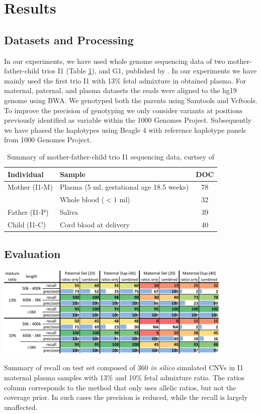 \section{Results}

\subsection{Datasets and Processing}
\label{data}
In our experiments, we have used whole genome sequencing data of two mother-father-child trios I1 (Table \ref{tab:I1}), and G1, published by \cite{kitzman2012}. In our experiments we have mainly used the first trio I1 with 13\% fetal admixture in obtained plasma. For maternal, paternal, and plasma datasets the reads were aligned to the hg19 genome using BWA. We genotyped both the parents using Samtools and Vcftools. To improve the precision of genotyping we only consider variants at positions previously identified as variable within the 1000 Genomes Project.  Subsequently we have phased the haplotypes using Beagle 4 \cite{browning2013} with reference haplotype panels from 1000 Genomes Project. 
\begin{table}[t]
\centering
\begin{tabular}{l|l|c}
Individual & Sample & DOC \\ \hline
Mother (I1-M) & Plasma (5 ml, gestational age 18.5 weeks) & 78 \\
	& Whole blood ($<1$ ml) & 32 \\
Father (I1-P) & Saliva & 39 \\
Child (I1-C) & Cord blood at delivery & 40
\end{tabular}
\vspace{3pt}
\caption{Summary of mother-father-child trio I1 sequencing data, curtsey of \cite{kitzman2012}  }
\label{tab:I1} 
\end{table}

\subsection{Evaluation}
\begin{table}[t]
\centering
\includegraphics[width=0.85\textwidth]{figures/ismb_res_color}
\caption{Summary of recall on test set composed of 360 \emph{in silico} simulated CNVs in I1 maternal plasma samples with 13\% and 10\% fetal admixture ratio. The ratios column corresponds to the method that only uses allelic ratios, but not the coverage prior. In such cases the precision is reduced, while the recall is largely unaffected.  }
\label{tab:resRecall} 
\end{table}

